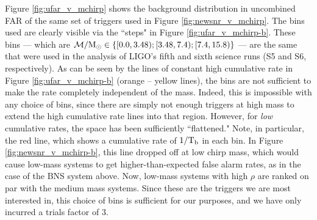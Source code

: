 Figure \ref{fig:ufar_v_mchirp} shows the background distribution in uncombined \ac{FAR} of the same set of triggers used in Figure \ref{fig:newsnr_v_mchirp}. The bins used are clearly visible via the ``steps" in Figure \ref{fig:ufar_v_mchirp-b}. These bins --- which are $\mathcal{M}/\mathrm{M_\odot} \in \{ [0.0, 3.48); [3.48, 7.4); [7.4, 15.8) \}$ --- are the same that were used in the analysis of LIGO's fifth and sixth science runs (S5 and S6, respectively). As can be seen by the lines of constant high cumulative rate in Figure \ref{fig:ufar_v_mchirp-b} (orange -- yellow lines), the bins are not sufficient to make the rate completely independent of the mass. Indeed, this is impossible with any choice of bins, since there are simply not enough triggers at high mass to extend the high cumulative rate lines into that region. However, for \emph{low} cumulative rates, the space has been sufficiently ``flattened." Note, in particular, the red line, which shows a cumulative rate of $1/\mathrm{T_b}$ in each bin. In Figure \ref{fig:newsnr_v_mchirp-b}, this line dropped off at low chirp mass, which would cause low-mass systems to get higher-than-expected false alarm rates, as in the case of the \ac{BNS} system above. Now, low-mass systems with high $\rho$ are ranked on par with the medium mass systems. Since these are the triggers we are most interested in, this choice of bins is sufficient for our purposes, and we have only incurred a trials factor of 3.

